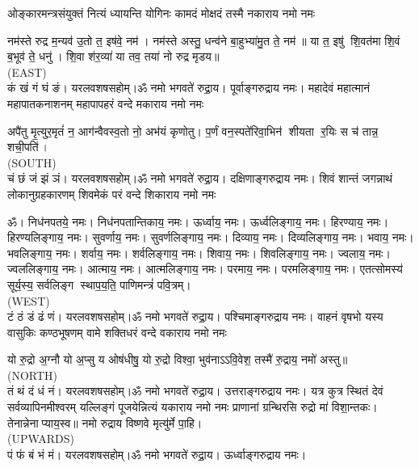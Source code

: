 


\twolineshloka
{ओङ्कारमन्त्रसंयुक्तं नित्यं ध्यायन्ति योगिनः}
{कामदं मोक्षदं तस्मै नकाराय नमो नमः}

नम॑स्ते रुद्र म॒न्यव॑ उ॒तो त॒ इष॑वे॒ नम॑। नम॑स्ते अस्तु॒ धन्व॑ने बा॒हुभ्या॑मु॒त ते॒ नम॑॥ या त॒ इषु॑ शि॒वत॑मा शि॒वं ब॒भूव॑ ते॒ धनु॑। शि॒वा श॑र॒व्या॑ या तव॒ तया॑ नो रुद्र मृडय॥\\
{\scriptsize (EAST)}\\
कं खं गं घं ङं। यरलवशषसहोम्।ॐ नमो भगवते॑ रुद्रा॒य। पूर्वाङ्गरुद्राय नमः। 
\medskip
\twolineshloka
{महादेवं महात्मानं महापातकनाशनम्}
{महापापहरं वन्दे मकाराय नमो नमः}

अपै॑तु मृ॒त्युर॒मृतं॑ न॒ आग॑न्वैवस्व॒तो नो॒ अभ॑यं कृणोतु।
प॒र्णं वन॒स्पते॑रिवा॒भिन॑ शीयता र॒यिः स च॑ तान्न॒ शची॒पति॑।\\
{\scriptsize (SOUTH)}\\
चं छं जं झं ञं। यरलवशषसहोम्।ॐ नमो भगवते॑ रुद्रा॒य। दक्षिणाङ्गरुद्राय नमः।
\medskip
\twolineshloka
{शिवं शान्तं जगन्नाथं लोकानुग्रहकारणम्}
{शिवमेकं परं वन्दे शिकाराय नमो नमः}

ॐ। निध॑नपतये॒ नमः। निध॑नपतान्तिकाय॒ नमः। ऊर्ध्वाय॒ नमः। ऊर्ध्वलिङ्गाय॒ नमः। हिरण्याय॒ नमः। हिरण्यलिङ्गाय॒ नमः। सुवर्णाय॒ नमः। सुवर्णलिङ्गाय॒ नमः। दिव्याय॒ नमः। दिव्यलिङ्गाय॒ नमः। भवाय॒ नमः। भवलिङ्गाय॒ नमः। शर्वाय॒ नमः। शर्वलिङ्गाय॒ नमः। शिवाय॒ नमः। शिवलिङ्गाय॒ नमः। ज्वलाय॒ नमः। ज्वललिङ्गाय॒ नमः। आत्माय॒ नमः। आत्मलिङ्गाय॒ नमः। परमाय॒ नमः। परमलिङ्गाय॒ नमः। एतत्सोमस्य॑ सूर्य॒स्य॒ सर्वलिङ्ग स्थाप॒य॒ति॒ पाणिमन्त्रं॑ पवि॒त्रम्।\\
{\scriptsize (WEST)}\\
टं ठं डं ढं णं। यरलवशषसहोम्।ॐ नमो भगवते॑ रुद्रा॒य। पश्चिमाङ्गरुद्राय नमः।
\medskip
\twolineshloka
{वाहनं वृषभो यस्य वासुकिः कण्ठभूषणम्}
{वामे शक्तिधरं वन्दे वकाराय नमो नमः}

यो रु॒द्रो अ॒ग्नौ यो अ॒प्सु य ओष॑धीषु॒ यो रु॒द्रो विश्वा॒ भुव॑नाऽऽवि॒वेश॒ तस्मै॑ रु॒द्राय॒ नमो॑ अस्तु॥ \\
{\scriptsize (NORTH)}\\
तं थं दं धं नं। यरलवशषसहोम्।ॐ नमो भगवते॑ रुद्रा॒य। उत्तराङ्गरुद्राय नमः।
\medskip
\twolineshloka
{यत्र कुत्र स्थितं देवं सर्वव्यापिनमीश्वरम्}
{यल्लिङ्गं पूजयेन्नित्यं यकाराय नमो नमः}
प्राणानां ग्रन्थिरसि रुद्रो मा॑ विशा॒न्तकः। तेनान्नेनाप्याय॒स्व॥ नमो रुद्राय विष्णवे मृत्यु॑र्मे पा॒हि।\\
{\scriptsize (UPWARDS)}\\
पं फं बं भं मं। यरलवशषसहोम्।ॐ नमो भगवते॑ रुद्रा॒य। ऊर्ध्वाङ्गरुद्राय नमः।

